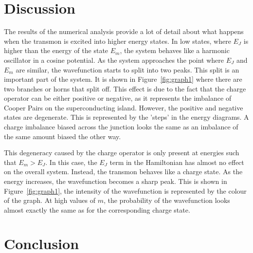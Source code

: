 \documentclass[11pt]{article}
\begin{document}
\section{Discussion}
The results of the numerical analysis provide a lot of detail about what happens when the transmon is excited into higher energy states. In low states, where $E_J$ is higher than the energy of the state $E_m$, the system behaves like a harmonic oscillator in a cosine potential. As the system approaches the point where $E_J$ and $E_m$ are similar, the wavefunction starts to split into two peaks. This split is an important part of the system. It is shown in Figure~\ref{fig:graph1} where there are two branches or horns that split off. This effect is due to the fact that the charge operator can be either positive or negative, as it represents the imbalance of Cooper Pairs on the superconducting island. However, the positive and negative states are degenerate. This is represented by the 'steps' in the energy diagrams. A charge imbalance biased across the junction looks the same as an imbalance of the same amount biased the other way.

This degeneracy caused by the charge operator is only present at energies such that $E_m > E_J$. In this case, the $E_J$ term in the Hamiltonian has almost no effect on the overall system. Instead, the transmon behaves like a charge state.  As the energy increases, the wavefunction becomes a sharp peak. This is shown in Figure~\ref{fig:graph1}, the intensity of the wavefunction is represented by the colour of the graph. At high values of $m$, the probability of the wavefunction looks almost exactly the same as for the corresponding charge state.

\section{Conclusion}
\end{document}
